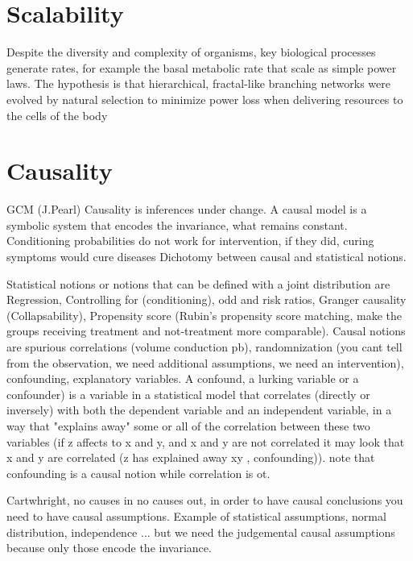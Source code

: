 \documentclass[onecollarge,runningheads]{svjour2}
\begin{document}
\section{Scalability}
Despite the diversity and complexity of organisms, key biological processes generate rates, for example the basal metabolic rate that scale as simple power laws. The hypothesis is that hierarchical, fractal-like branching networks were evolved by natural selection to minimize power loss when delivering resources to the cells of the body %

\section{Causality}
GCM (J.Pearl) Causality is inferences under change. A causal model is a symbolic system that encodes the invariance, what remains constant.
Conditioning probabilities do not work for intervention, if they did, curing symptoms would cure diseases
Dichotomy between causal and statistical notions.

Statistical notions or notions that can be defined with a joint distribution are Regression, Controlling for (conditioning), odd and risk ratios, Granger causality (Collapsability), Propensity score (Rubin's propensity score matching, make the groups receiving treatment and not-treatment more comparable).
Causal notions are spurious correlations (volume conduction pb), randomnization (you cant tell from the observation, we need additional assumptions, we need an intervention), confounding, explanatory variables.
A confound, a lurking variable or a confounder) is a variable in a statistical model that correlates (directly or inversely) with both the dependent variable and an independent variable,  in a way that "explains away" some or all of the correlation between these two variables (if z affects to x and y, and x and y are not correlated it may look that x and y are correlated (z has explained away xy , confounding)). note that confounding is a causal notion while correlation is ot.

Cartwhright, no causes in no causes out, in order to have causal conclusions you need to have causal assumptions. Example of statistical assumptions, normal distribution, independence ... but we need the judgemental causal assumptions because only those encode the invariance.
\end{document}
